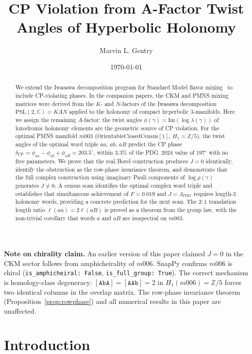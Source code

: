 \documentclass[11pt,a4paper]{article}
\title{CP Violation from A-Factor Twist Angles of Hyperbolic Holonomy}
\author[1]{Marvin L. Gentry}
\affil[1]{Independent Researcher, Seattle, WA, USA. \texttt{drmlgentry@protonmail.com}. ORCID: 0009-0006-4550-2663}
\date{\today}
\begin{document}
\maketitle

\noindent\textbf{Note on chirality claim.} An earlier version of this paper claimed $J=0$ in the CKM sector follows from amphicheirality of $m006$. SnapPy confirms $m006$ is chiral (\texttt{is\_amphicheiral: False}, \texttt{is\_full\_group: True}). The correct mechanism is homology-class degeneracy: $[\texttt{AbA}]=[\texttt{AAb}]=2$ in $H_1(m006)=\mathbb{Z}/5$ forces two identical columns in the overlap matrix. The row-phase invariance theorem (Proposition~\ref{prop:rowphase}) and all numerical results in this paper are unaffected.

\begin{abstract}
We extend the Iwasawa decomposition program for Standard Model flavor
mixing~\cite{Gentry2026c,Gentry2026b} to include CP-violating phases.
In the companion papers, the CKM and PMNS mixing matrices were derived
from the $K$- and $N$-factors of the Iwasawa decomposition
$\mathrm{PSL}(2,\mathbb{C}) = KAN$ applied to the holonomy of compact
hyperbolic 3-manifolds.  Here we assign the remaining $A$-factor: the
twist angles $\phi(\gamma) = \mathrm{Im}(\log\lambda(\gamma))$ of
loxodromic holonomy elements are the geometric source of CP violation.
For the optimal PMNS manifold $m003$
($\mathrm{OrientableClosedCensus}[1]$, $H_1 = \mathbb{Z}/5$), the
twist angles of the optimal word triple $aa$, $ab$, $aB$ predict the
CP phase
$\delta_{\mathrm{CP}} = \phi_{aa} - \phi_{ab} + \phi_{aB} = 203.5^\circ$,
within 3.3\% of the PDG~2024 value of $197^\circ$ with no free
parameters.  We prove that the real Borel construction produces $J=0$
identically, identify the obstruction as the row-phase invariance
theorem, and demonstrate that the full complex construction using
imaginary Pauli components of $\log\rho(\gamma)$ generates $J\neq 0$.
A census scan identifies the optimal complex word triple and
establishes that simultaneous achievement of $F = 0.019$ and
$J = J_{\mathrm{PDG}}$ requires length-3 holonomy words, providing a
concrete prediction for the next scan.  The $2\!:\!1$ translation
length ratio $\ell(aa) = 2\ell(aB)$ is proved as a theorem from the
group law, with the non-trivial corollary that words $a$ and $aB$ are
isospectral on $m003$.
\end{abstract}

\section{Introduction}
\label{sec:intro}
\end{document}
